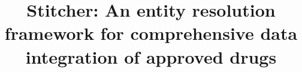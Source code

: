 \documentclass{bmcart}
\begin{document}
\begin{frontmatter}

\begin{fmbox}


\title{Stitcher: An entity resolution framework for comprehensive data
  integration of approved drugs}


\author[
   addressref={ncats},                   %
   corref={ncats},                       %
   email={nguyenda@mail.nih.gov}   %
]{ }
\author{ }
\author{ }
\author{ }
\author[noteref={fda}]{ }
\author{ }
\author{ }



\address[id=ncats]{%
  , %
}


\end{fmbox}
\end{frontmatter}
\end{document}
